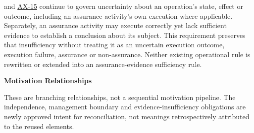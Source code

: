 \hyperref[element:fc732b64fc564127b73174e28d9ccce8]{\texttt{}} and \hyperref[element:ef8abbaec37e4890ad78b9f263e67906]{AX-15} continue to govern uncertainty about an operation's state, effect or outcome, including an assurance activity's own execution where applicable. Separately, an assurance activity may execute correctly yet lack sufficient evidence to establish a conclusion about its subject. This requirement preserves that insufficiency without treating it as an uncertain execution outcome, execution failure, assurance or non-assurance. Neither existing operational rule is rewritten or extended into an assurance-evidence sufficiency rule.



\par\medskip\textbf{Motivation Relationships}\par


These are branching relationships, not a sequential motivation pipeline. The independence, management boundary and evidence-insufficiency obligations are newly approved intent for reconciliation, not meanings retrospectively attributed to the reused elements.




